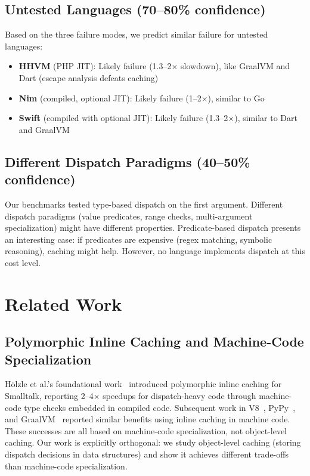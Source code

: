 \documentclass[sigplan,final,acmsmall,review,screen]{acmart}
\begin{document}
\subsection{Untested Languages (70--80\% confidence)}

Based on the three failure modes, we predict similar failure for untested languages:

\begin{itemize}
  \item \textbf{HHVM} (PHP JIT): Likely failure (1.3--2× slowdown), like GraalVM and Dart (escape analysis defeats caching)

  \item \textbf{Nim} (compiled, optional JIT): Likely failure (1--2×), similar to Go

  \item \textbf{Swift} (compiled with optional JIT): Likely failure (1.3--2×), similar to Dart and GraalVM
\end{itemize}

\subsection{Different Dispatch Paradigms (40--50\% confidence)}

Our benchmarks tested type-based dispatch on the first argument. Different dispatch paradigms
(value predicates, range checks, multi-argument specialization) might have different properties.
Predicate-based dispatch presents an interesting case: if predicates are expensive (regex matching,
symbolic reasoning), caching might help. However, no language implements dispatch at this cost
level.

\section{Related Work}

\subsection{Polymorphic Inline Caching and Machine-Code Specialization}

Hölzle et al.'s foundational work~\cite{hoelzle1991optimizing} introduced polymorphic inline
caching for Smalltalk, reporting 2--4× speedups for dispatch-heavy code through machine-code type checks embedded in compiled code.
Subsequent work in V8~\cite{bak2010v8}, PyPy~\cite{pypy2}, and GraalVM~\cite{graalvm} reported similar benefits using inline caching in machine code.
These successes are all based on machine-code specialization, not object-level caching. Our work is explicitly orthogonal:
we study object-level caching (storing dispatch decisions in data structures) and show it achieves different trade-offs than machine-code specialization.
\end{document}
